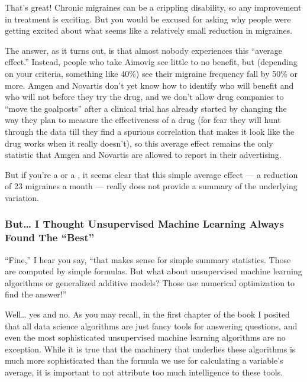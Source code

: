 \documentclass[letterpaper,10pt,english]{jupyterBook}
\begin{document}
\sphinxAtStartPar
{}

\sphinxAtStartPar
That’s great! Chronic migraines can be a crippling disability, so any improvement in treatment is exciting. But you would be excused for asking why people were getting  excited about what seems like a relatively small reduction in migraines.

\sphinxAtStartPar
The answer, as it turns out, is that almost nobody experiences this “average effect.” Instead,  people who take Aimovig see little to no benefit, but  (depending on your criteria, something like 40\%) see their migraine frequency fall by 50\% or more. Amgen and Novartis don’t yet know how to identify who will benefit and who will not before they try the drug, and we don’t allow drug companies to “move the goalposts” after a clinical trial has already started by changing the way they plan to measure the effectiveness of a drug (for fear they will hunt through the data till they find a spurious correlation that makes it look like the drug works when it really doesn’t), so this average effect remains the only statistic that Amgen and Novartis are allowed to report in their advertising.

\sphinxAtStartPar
But if you’re a  or a , it seems clear that this simple average effect — a reduction of 2\sphinxhyphen{}3 migraines a month — really does not provide a  summary of the underlying variation.


\subsubsection{But… I Thought Unsupervised Machine Learning Always Found The “Best”}
\label{\detokenize{30_questions/15_answering_exploratory_questions:but-i-thought-unsupervised-machine-learning-always-found-the-best}}
\sphinxAtStartPar
“Fine,” I hear you say, “that makes sense for simple summary statistics. Those are computed by simple formulas. But what about unsupervised machine learning algorithms or generalized additive models? Those use numerical optimization to find the  answer!”

\sphinxAtStartPar
Well… yes and no. As you may recall, in the first chapter of the book I posited that all data science algorithms are just fancy tools for answering questions, and even the most sophisticated unsupervised machine learning algorithms are no exception. While it is true that the machinery that underlies these algorithms is much more sophisticated than the formula we use for calculating a variable’s average, it is important to not attribute too much intelligence to these tools.
\end{document}
